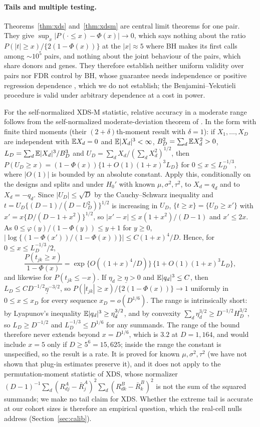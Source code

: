 \paragraph{Tails and multiple testing.} Theorems~\ref{thm:xds} and~\ref{thm:xdsm} are central limit theorems for one pair. They give $\sup_x|P(\cdot\le x)-\Phi(x)|\to0$, which says nothing about the ratio $P(|t|\ge x)/\{2(1-\Phi(x))\}$ at the $|x|\approx5$ where BH makes its first calls among $\sim10^5$ pairs, and nothing about the joint behaviour of the pairs, which share donors and genes. They therefore establish neither uniform validity over pairs nor FDR control by BH, whose guarantee needs independence or positive regression dependence \citep{BenjaminiYekutieli2001}, which we do not establish; the Benjamini--Yekutieli procedure is valid under arbitrary dependence at a cost in power.

For the self-normalized XDS-M statistic, relative accuracy in a moderate range follows from the self-normalized moderate-deviation theorem of \citet{JingShaoWang2003}. In the form with finite third moments (their $(2+\delta)$th-moment result with $\delta=1$): if $X_1,\dots,X_D$ are independent with $\mathbb{E} X_d=0$ and $\mathbb{E}|X_d|^3<\infty$, $B_D^2=\sum_d\mathbb{E} X_d^2>0$, $L_D=\sum_d\mathbb{E}|X_d|^3/B_D^3$ and $U_D=\sum_dX_d/(\sum_dX_d^2)^{1/2}$, then $P(U_D\ge x)=(1-\Phi(x))\{1+O(1)(1+x)^3L_D\}$ for $0\le x\le L_D^{-1/3}$, where $|O(1)|$ is bounded by an absolute constant. Apply this, conditionally on the designs and splits and under $H_0'$ with known $\mu,\sigma^2,\tau^2$, to $X_d=q_d$ and to $X_d=-q_d$. Since $|U_D|\le\sqrt D$ by the Cauchy--Schwarz inequality and $t=U_D\{(D-1)/(D-U_D^2)\}^{1/2}$ is increasing in $U_D$, $\{t\ge x\}=\{U_D\ge x'\}$ with $x'=x\{D/(D-1+x^2)\}^{1/2}$, so $|x'-x|\le x(1+x^2)/(D-1)$ and $x'\le2x$. As $0\le\varphi(y)/(1-\Phi(y))\le y+1$ for $y\ge0$, $|\log\{(1-\Phi(x'))/(1-\Phi(x))\}|\le C(1+x)^4/D$. Hence, for $0\le x\le L_D^{-1/3}/2$,
\[\frac{P(t_{jk}\ge x)}{1-\Phi(x)}=\exp\{O((1+x)^4/D)\}\,\{1+O(1)(1+x)^3L_D\},\]
and likewise for $P(t_{jk}\le-x)$. If $\eta_d\ge\underline\eta>0$ and $\mathbb{E}|q_d|^3\le C$, then $L_D\le CD^{-1/2}\underline\eta^{-3/2}$, so $P(|t_{jk}|\ge x)/\{2(1-\Phi(x))\}\to1$ uniformly in $0\le x\le x_D$ for every sequence $x_D=o(D^{1/6})$. The range is intrinsically short: by Lyapunov's inequality $\mathbb{E}|q_d|^3\ge\eta_d^{3/2}$, and by convexity $\sum_d\eta_d^{3/2}\ge D^{-1/2}H_D^{3/2}$, so $L_D\ge D^{-1/2}$ and $L_D^{-1/3}\le D^{1/6}$ for any summands. The range of the bound therefore never extends beyond $x=D^{1/6}$, which is $3.2$ at $D=1{,}164$, and would include $x=5$ only if $D\ge5^6=15{,}625$; inside the range the constant is unspecified, so the result is a rate. It is proved for known $\mu,\sigma^2,\tau^2$ (we have not shown that plug-in estimates preserve it), and it does not apply to the permutation-moment statistic of XDS, whose normalizer $(D-1)^{-1}\sum_d(R^A_{dj}-\bar R^A_j)^2\sum_d(R^B_{dk}-\bar R^B_k)^2$ is not the sum of the squared summands; we make no tail claim for XDS. Whether the extreme tail is accurate at our cohort sizes is therefore an empirical question, which the real-cell nulls address (Section~\ref{sec:calib}).

